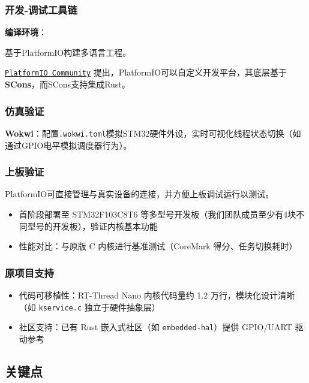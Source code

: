 \subsubsection{开发-调试工具链}

\textbf{编译环境}：

基于PlatformIO构建多语言工程。

\href{https://community.platformio.org/t/support-for-different-languages-and-compilers/921}{\texttt{PlatformIO Community}} 提出，PlatformIO可以自定义开发平台，其底层基于\textbf{SCons}，而SCons支持集成Rust。

\subsubsection{仿真验证}

\textbf{Wokwi}：配置\texttt{.wokwi.toml}模拟STM32硬件外设，实时可视化线程状态切换（如通过GPIO电平模拟调度器行为）。


\subsubsection{上板验证}

PlatformIO可直接管理与真实设备的连接，并方便上板调试运行以测试。
\begin{itemize}
    \item 首阶段部署至 STM32F103C8T6 等多型号开发板（我们团队成员至少有4块不同型号的开发板），验证内核基本功能
    \item 性能对比：与原版 C 内核进行基准测试（CoreMark 得分、任务切换耗时）
\end{itemize}

\subsubsection{原项目支持}

\begin{itemize}
    \item 代码可移植性：RT-Thread Nano 内核代码量约 1.2 万行，模块化设计清晰（如 \texttt{kservice.c} 独立于硬件抽象层）
    \item 社区支持：已有 Rust 嵌入式社区（如 \texttt{embedded-hal}）提供 GPIO/UART 驱动参考
\end{itemize}

\subsection{关键点}

